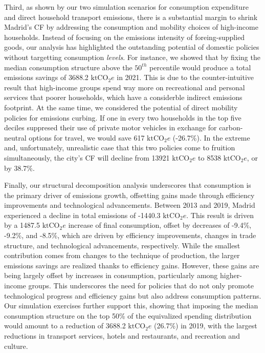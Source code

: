 \documentclass[
  10pt,
  twocolumn]{aft}
\begin{document}
Third, as shown by our two simulation scenarios for consumption
expenditure and direct household transport emissions, there is a
substantial margin to shrink Madrid's CF by addressing the consumption
and mobility choices of high-income households. Instead of focusing on
the emissions intensity of foreing-supplied goods, our analysis has
highlighted the outstanding potential of domestic policies without
targetting consumption \emph{levels}. For instance, we showed that by
fixing the median consumption structure above the \(50^{th}\) percentile
would produce a total emissions savings of 3688.2 \(\text{ktCO}_2e\) in
2021. This is due to the counter-intuitive result that high-income
groups spend way more on recreational and personal services that poorer
households, which have a considerble indirect emissions footprint. At
the same time, we considered the potential of direct mobility policies
for emissions curbing. If one in every two households in the top five
deciles suppresed their use of private motor vehicles in exchange for
carbon-neutral options for travel, we would save 617 \(\text{ktCO}_2e\)
(-26.7\%). In the extreme and, unfortunately, unrealistic case that this
two policies come to fruition simultaneously, the city's CF will decline
from 13921 \(\text{ktCO}_2e\) to 8538 \(\text{ktCO}_2e\), or by 38.7\%.

Finally, our structural decomposition analysis underscores that
consumption is the primary driver of emissions growth, offsetting gains
made through efficiency improvements and technological advancements.
Between 2013 and 2019, Madrid experienced a decline in total emissions
of -1440.3 \(\text{ktCO}_2e\). This result is driven by a 1487.5
\(\text{ktCO}_2e\) increase of final consumption, offset by decreases of
-9.4\%, -9.2\%, and -8.5\%, which are driven by efficiency improvements,
changes in trade structure, and technological advancements,
respectively. While the smallest contribution comes from changes to the
technique of production, the larger emissions savings are realized
thanks to efficiency gains. However, these gains are being largely
offset by increases in consumption, particularly among higher-income
groups. This underscores the need for policies that do not only promote
technological progress and efficiency gains but also address consumption
patterns. Our simulation exercises further support this, showing that
imposing the median consumption structure on the top 50\% of the
equivalized spending distribution would amount to a reduction of 3688.2
\(\text{ktCO}_2e\) (26.7\%) in 2019, with the largest reductions in
transport services, hotels and restaurants, and recreation and culture.
\end{document}
